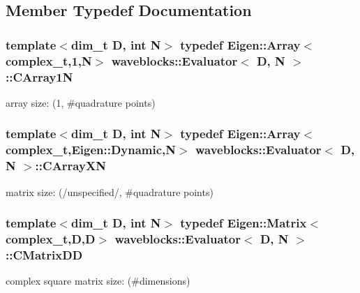 \subsection{Member Typedef Documentation}
\hypertarget{classwaveblocks_1_1_evaluator_a49231d0afba65ca701dfdfb9f3c44c14}{}
\subsubsection[{C\+Array1\+N}]{\setlength{\rightskip}{0pt plus 5cm}template$<$dim\+\_\+t D, int N$>$ typedef Eigen\+::\+Array$<$complex\+\_\+t,1,N$>$ {\bf waveblocks\+::\+Evaluator}$<$ D, N $>$\+::{\bf C\+Array1\+N}}\label{classwaveblocks_1_1_evaluator_a49231d0afba65ca701dfdfb9f3c44c14}
array size\+: (1, \#quadrature points) \hypertarget{classwaveblocks_1_1_evaluator_ae67334d6256ba6054f452a15d36c4941}{}
\subsubsection[{C\+Array\+X\+N}]{\setlength{\rightskip}{0pt plus 5cm}template$<$dim\+\_\+t D, int N$>$ typedef Eigen\+::\+Array$<$complex\+\_\+t,Eigen\+::\+Dynamic,N$>$ {\bf waveblocks\+::\+Evaluator}$<$ D, N $>$\+::{\bf C\+Array\+X\+N}}\label{classwaveblocks_1_1_evaluator_ae67334d6256ba6054f452a15d36c4941}
matrix size\+: (/unspecified/, \#quadrature points) \hypertarget{classwaveblocks_1_1_evaluator_a09bb8abec377b4651699c52d02447ad5}{}
\subsubsection[{C\+Matrix\+D\+D}]{\setlength{\rightskip}{0pt plus 5cm}template$<$dim\+\_\+t D, int N$>$ typedef Eigen\+::\+Matrix$<$complex\+\_\+t,D,D$>$ {\bf waveblocks\+::\+Evaluator}$<$ D, N $>$\+::{\bf C\+Matrix\+D\+D}}\label{classwaveblocks_1_1_evaluator_a09bb8abec377b4651699c52d02447ad5}
complex square matrix size\+: (\#dimensions) \hypertarget{classwaveblocks_1_1_evaluator_ac9f759ecd07665903ed76d82ac68dc9a}{}

